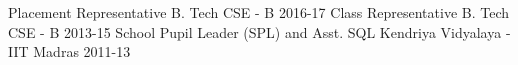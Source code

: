 \begin{cvhonors}
  \cvhonor
    {Placement Representative}
    {B. Tech CSE - B}
    {\empty}
    {2016-17}
  \cvhonor
    {Class Representative}
    {B. Tech CSE - B}
    {\empty}
    {2013-15}
  \cvhonor
    {School Pupil Leader (SPL) and Asst. SQL}
    {Kendriya Vidyalaya - IIT Madras}
    {\empty}
    {2011-13}
\end{cvhonors}
